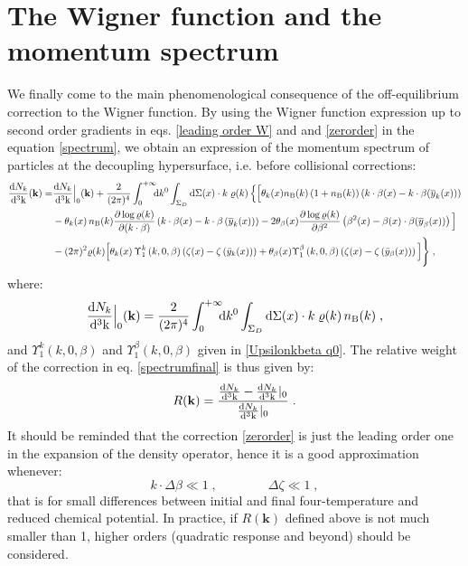 \documentclass[prd,superscriptaddress,nofootinbib,notitlepage]{revtex4-1}
\newcommand{\kk}{{\rm k}}
\newcommand{\di}{{\rm d}}
\newcommand{\kb}{{\mathbf{k}}}
\newcommand{\be}{\begin{equation}}
\newcommand{\ee}{\end{equation}}
\begin{document}
\section{The Wigner function and the momentum spectrum}
\label{sec:spectrum}

We finally come to the main phenomenological consequence of the off-equilibrium correction to the Wigner function. 
By using the Wigner function expression up to second order gradients in eqs. \eqref{leading order W} and and \eqref{zerorder} 
in the equation \eqref{spectrum}, we obtain an expression of the momentum spectrum of particles at the decoupling hypersurface, 
i.e. before collisional corrections:
%
\begin{equation}\label{spectrumfinal}
\begin{split}
\frac{\di N_k}{\di^3 \kk}(\kb) = & \frac{\di N_k}{\di^3 \kk}\Big|_0(\kb) + \frac{2}{(2\pi)^4}\int_0^{+\infty} 
\!\!\! \di k^0 \int_{\Sigma_D}\di\Sigma(x) \cdot k \;\varrho(k)\,\Big\{ \Big[ \theta_k(x)  n_{\rm B}(k) \left(1+n_{\rm B}(k)\right)\left( k\cdot\beta(x)-k\cdot\beta(\overline{y}_k(x))\right)
\\
&-\theta_k(x)\, n_{\rm B}(k) \frac{\partial\log\varrho(k)}
{\partial(k\cdot\beta)}\left(k\cdot\beta(x)-k\cdot\beta\left(\overline{y}_k(x)\right)\right)-2\theta_\beta(x)\frac{\partial\log\varrho(k)}{\partial\beta^2}\left(\beta^2(x)-\beta(x)\cdot 
\beta(\overline{y}_\beta(x))\right)\Big] \\
&-(2\pi)^2\varrho(k)\Big[\theta_k(x)\,\Upsilon^k_1\left(k,0,\beta\right)\left(\zeta(x)-\zeta\left(\bar{y}_k(x)\right)\right)+\theta_\beta(x)\Upsilon^\beta_1\left(k,0,\beta\right)\left(\zeta(x)-\zeta\left(\bar{y}_\beta(x)\right)\right)\Big]\Bigg\}\;,
\end{split}
\end{equation}
%
where:
%
\begin{equation*}
\frac{\di N_k}{\di^3 \kk}\Big|_0(\kb) = \frac{2}{(2\pi)^4}\int_0^{+\infty} \!\!\! \di k^0 \int_{\Sigma_D}
\di\Sigma(x) \cdot k \;\varrho(k)\, n_{\rm B}(k)\;,
\end{equation*}
%
and $\Upsilon^k_1\left(k,0,\beta\right)$ and $\Upsilon^\beta_1\left(k,0,\beta\right)$ given in \eqref{Upsilonkbeta q0}.
The relative weight of the correction in eq. \eqref{spectrumfinal} is thus given by:
%
\be\label{spectrumratio}
 R(\kb) = \frac{\frac{\di N_k}{\di^3 \kk}-\frac{\di N_k}{\di^3 \kk}|_0}{\frac{\di N_k}{\di^3 \kk}|_0}\;.
\ee
%
It should be reminded that the correction \eqref{zerorder} is just the leading order one in the expansion of the
density operator, hence it is a good approximation whenever:
%
$$
  k \cdot \Delta \beta \ll 1\;,  \qquad \qquad \Delta \zeta \ll 1\;,
$$
%
that is for small differences between initial and final four-temperature and reduced chemical potential.
In practice, if $R(\kb)$ defined above is not much smaller than 1, higher orders (quadratic response and beyond) 
should be considered. 
\end{document}
